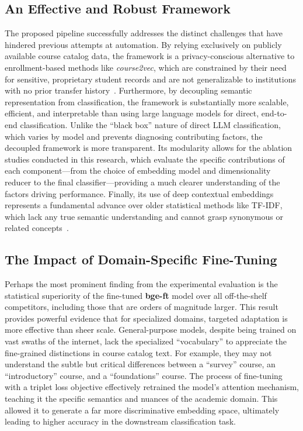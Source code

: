 \subsection{An Effective and Robust Framework}\label{ch:5.1.1}
The proposed pipeline successfully addresses the distinct challenges that have hindered previous attempts at automation. By relying exclusively on publicly available course catalog data, the framework is a privacy-conscious alternative to enrollment-based methods like \emph{course2vec}, which are constrained by their need for sensitive, proprietary student records and are not generalizable to institutions with no prior transfer history~\cite{PardosCourse2Vec2019, slade10.1177/0002764213479366}. Furthermore, by decoupling semantic representation from classification, the framework is substantially more scalable, efficient, and interpretable than using large language models for direct, end-to-end classification. Unlike the ``black box'' nature of direct LLM classification, which varies by model and prevents diagnosing contributing factors, the decoupled framework is more transparent. Its modularity allows for the ablation studies conducted in this research, which evaluate the specific contributions of each component---from the choice of embedding model and dimensionality reducer to the final classifier---providing a much clearer understanding of the factors driving performance. Finally, its use of deep contextual embeddings represents a fundamental advance over older statistical methods like TF-IDF, which lack any true semantic understanding and cannot grasp synonymous or related concepts~\cite{AIZAWA200345}.

\subsection{The Impact of Domain-Specific Fine-Tuning}\label{ch:5.1.2}
Perhaps the most prominent finding from the experimental evaluation is the statistical superiority of the fine-tuned \textbf{bge-ft} model over all off-the-shelf competitors, including those that are orders of magnitude larger. This result provides powerful evidence that for specialized domains, targeted adaptation is more effective than sheer scale. General-purpose models, despite being trained on vast swaths of the internet, lack the specialized ``vocabulary'' to appreciate the fine-grained distinctions in course catalog text. For example, they may not understand the subtle but critical differences between a ``survey'' course, an ``introductory'' course, and a ``foundations'' course. The process of fine-tuning with a triplet loss objective effectively retrained the model's attention mechanism, teaching it the specific semantics and nuances of the academic domain. This allowed it to generate a far more discriminative embedding space, ultimately leading to higher accuracy in the downstream classification task.


